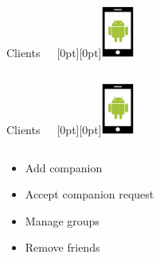 \documentclass[11pt]{beamer}
\begin{document}
\begin{frame}{Clients~~~\raisebox{-10pt}[0pt][0pt]{\includegraphics[width=0.08\textwidth]{tech-stack-android}}}
\begin{columns}[T]
\begin{column}{.4\textwidth}
	\end{column}
\end{columns}
\end{frame}

\begin{frame}{Clients~~~\raisebox{-10pt}[0pt][0pt]{\includegraphics[width=0.08\textwidth]{tech-stack-android}}}

\begin{columns}[T]
	\begin{column}{.6\textwidth}
	\begin{itemize}
		\item Add companion
		\item Accept companion request
		\item Manage groups
		\item Remove friends
	\end{itemize}
	\end{column}
	\begin{column}{.4\textwidth}

\end{column}
\end{columns}
\end{frame}
\end{document}
